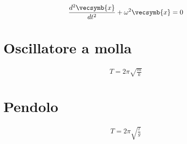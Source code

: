 \begin{align}
    \frac{d^2\vecsymb{x}}{dt^2} + \omega^2\vecsymb{x} = 0\label{harmony}
\end{align}

\section{Oscillatore a molla}

\begin{align}
    T = 2\pi \sqrt{\frac{m}{k}}
\end{align}

\section{Pendolo}

\begin{align}
    T = 2\pi \sqrt{\frac{l}{g}}
\end{align}